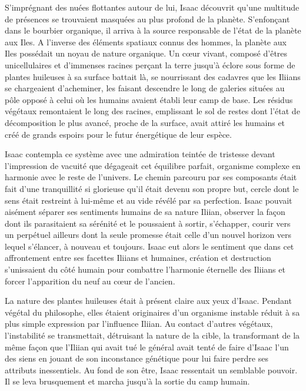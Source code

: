 \documentclass[12pt]{book}
\begin{document}
S'imprégnant des nuées flottantes autour de lui, Isaac découvrit qu'une multitude de présences se trouvaient masquées au plus profond de la planète. S'enfonçant dans le bourbier organique, il arriva à la source responsable de l'état de la planète aux Iles. A l'inverse des éléments spatiaux connus des hommes, la planète aux Iles possédait un noyau de nature organique. Un cœur vivant, composé d'êtres unicellulaires et d'immenses racines perçant la terre jusqu'à éclore sous forme de plantes huileuses à sa surface battait là, se nourrissant des cadavres que les Iliians se chargeaient d'acheminer, les faisant descendre le long de galeries situées au pôle opposé à celui où les humains avaient établi leur camp de base. Les résidus végétaux remontaient le long des racines, emplissant le sol de restes dont l'état de décomposition le plus avancé, proche de la surface, avait attiré les humains et créé de grands espoirs pour le futur énergétique de leur espèce.


Isaac contempla ce système avec une admiration teintée de tristesse devant l'impression de vacuité que dégageait cet équilibre parfait, organisme complexe en harmonie avec le reste de l'univers. Le chemin parcouru par ses composants était fait d'une tranquillité si glorieuse qu'il était devenu son propre but, cercle dont le sens était restreint à lui-même et au vide révélé par sa perfection. Isaac pouvait aisément séparer ses sentiments humains de sa nature Iliian, observer la façon dont ils parasitaient sa sérénité et le poussaient à sortir, s'échapper, courir vers un perpétuel ailleurs dont la seule promesse était celle d'un nouvel horizon vers lequel s'élancer, à nouveau et toujours. Isaac eut alors le sentiment que dans cet affrontement entre ses facettes Iliians et humaines, création et destruction s'unissaient du côté humain pour combattre l'harmonie éternelle des Iliians et forcer l'apparition du neuf au cœur de l'ancien.


La nature des plantes huileuses était à présent claire aux yeux d'Isaac. Pendant végétal du philosophe, elles étaient originaires d'un organisme instable réduit à sa plus simple expression par l'influence Iliian. Au contact d'autres végétaux, l'instabilité se transmettait, détruisant la nature de la cible, la transformant de la même façon que l'Iliian qui avait tué le général avait tenté de faire d'Isaac l'un des siens en jouant de son inconstance génétique pour lui faire perdre ses attributs inessentiels. Au fond de son être, Isaac ressentait un semblable pouvoir. Il se leva brusquement et marcha jusqu'à la sortie du camp humain.
\end{document}
